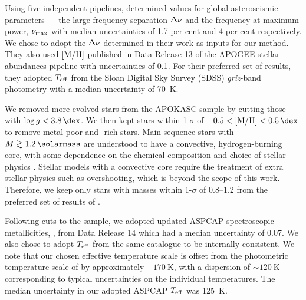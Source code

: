 Using five independent pipelines,  determined values for global asteroseismic parameters --- the large frequency separation ${\Delta\nu}$ and the frequency at maximum power, ${\nu_\mathrm{max}}$ with median uncertainties of 1.7 per cent and 4 per cent respectively. We chose to adopt the ${\Delta\nu}$ determined in their work as inputs for our method. They also used $[\mathrm{M}/\mathrm{H}]$ published in Data Release 13 \citep[DR13;][]{Albareti.AllendePrieto.ea2017} of the APOGEE stellar abundances pipeline \citep[ASPCAP;][]{GarciaPerez.AllendePrieto.ea2016} with uncertainties of \SI{0.1}{\dex}. For their preferred set of results, they adopted ${T_\mathrm{eff}}$ from the Sloan Digital Sky Survey (SDSS) \emph{griz}-band photometry \citep{Pinsonneault.An.ea2012} with a median uncertainty of \SI{70}{\kelvin}.

We removed more evolved stars from the APOKASC sample by cutting those with $\log g < \SI{3.8}{\dex}$. We then kept stars within 1-$\sigma$ of $-0.5 < \metallicity < \SI{0.5}{\dex}$ to remove metal-poor and -rich stars. Main sequence stars with $M \gtrsim \SI{1.2}{\solarmass}$ are understood to have a convective, hydrogen-burning core, with some dependence on the chemical composition and choice of stellar physics \citep{Appourchaux.Antia.ea2015}. Stellar models with a convective core require the treatment of extra stellar physics such as overshooting, which is beyond the scope of this work. Therefore, we keep only stars with masses within 1-$\sigma$ of \SIrange{0.8}{1.2}{\solarmass} from the preferred set of results of .

Following cuts to the sample, we adopted updated ASPCAP spectroscopic metallicities, \metallicity, from Data Release 14 \citep[DR14;][]{Blanton.Bershady.ea2017} which had a median uncertainty of \SI{0.07}{\dex}. We also chose to adopt ${T_\mathrm{eff}}$ from the same catalogue to be internally consistent. We note that our chosen effective temperature scale is offset from the photometric temperature scale of  by approximately $- \SI{170}{\kelvin}$, with a dispersion of $\sim \SI{120}{\kelvin}$ corresponding to typical uncertainties on the individual temperatures. The median uncertainty in our adopted ASPCAP ${T_\mathrm{eff}}$ was \SI{125}{\kelvin}.

